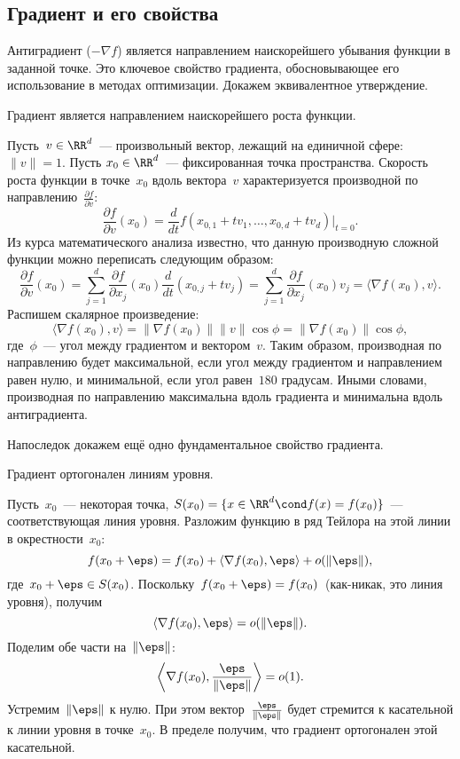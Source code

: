 \documentclass[12pt,fleqn]{article}
\begin{document}
\subsection{Градиент и его свойства}

Антиградиент ($-\nabla f$) является направлением наискорейшего убывания функции в заданной точке. Это ключевое свойство градиента, обосновывающее его использование в методах оптимизации. Докажем эквивалентное утверждение. 

\begin{vkState-rm} Градиент является направлением наискорейшего роста функции.
\end{vkState-rm}

\begin{vkProof} Пусть~$v \in \RR^d$~--- произвольный вектор, лежащий на единичной сфере: $\|v\| = 1$.
Пусть $x_0 \in \RR^d$~--- фиксированная точка пространства.
Скорость роста функции в точке~$x_0$ вдоль вектора~$v$ характеризуется
производной по направлению~$\frac{\partial f}{\partial v}$:
\[
    \frac{\partial f}{\partial v}(x_0)
    =
    \frac{d}{dt} f(x_{0,1} + t v_1, \dots, x_{0,d} + t v_d) |_{t = 0}.
\]
Из курса математического анализа известно, что данную производную сложной
функции можно переписать следующим образом:
\[
    \frac{\partial f}{\partial v}(x_0)
    =
    \sum_{j = 1}^{d}
        \frac{\partial f}{\partial x_j}(x_0)
        \frac{d}{dt} \left(x_{0,j} + t v_j\right)
    =
    \sum_{j = 1}^{d}
        \frac{\partial f}{\partial x_j}(x_0)
        v_j
    =
    \langle \nabla f(x_0), v \rangle.
\]
Распишем скалярное произведение:
\[
    \langle \nabla f(x_0), v \rangle
    =
    \|\nabla f(x_0)\| \|v\| \cos \phi
    =
    \|\nabla f(x_0)\| \cos \phi,
\]
где~$\phi$~--- угол между градиентом и вектором~$v$.
Таким образом, производная по направлению будет
максимальной, если угол между градиентом и направлением равен нулю,
и минимальной, если угол равен~$180$ градусам.
Иными словами, производная по направлению максимальна
вдоль градиента и минимальна вдоль антиградиента.

\end{vkProof}

Напоследок докажем ещё одно фундаментальное свойство градиента.

\begin{vkState-rm} Градиент ортогонален линиям уровня.
\end{vkState-rm}

\begin{vkProof}
Пусть~$x_0$~--- некоторая точка,
$S(x_0) = \{x \in \RR^d \cond f(x) = f(x_0)\}$~--- соответствующая линия уровня.
Разложим функцию в ряд Тейлора на этой линии в окрестности~$x_0$:
\[
    f(x_0 + \eps) = f(x_0) + \langle \nabla f(x_0), \eps \rangle + o(\|\eps\|),
\]
где~$x_0 + \eps \in S(x_0)$.
Поскольку~$f(x_0 + \eps) = f(x_0)$~(как-никак, это линия уровня), получим
\[
    \langle \nabla f(x_0), \eps \rangle = o(\|\eps\|).
\]
Поделим обе части на~$\|\eps\|$:
\[
    \left\langle \nabla f(x_0), \frac{\eps}{\|\eps\|} \right\rangle = o(1).
\]
Устремим~$\|\eps\|$ к нулю.
При этом вектор~$\frac{\eps}{\|\eps\|}$ будет стремится к касательной к линии уровня в точке~$x_0$.
В пределе получим, что градиент ортогонален этой касательной.

\end{vkProof}
\end{document}
